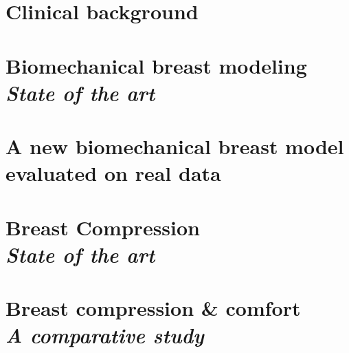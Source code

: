 \documentclass[a4paper,12pt,twoside]{report}
\begin{document}
\clearemptydoublepage

%

\chapter{ Clinical background}\label{chapter:clinicalbachground}


\clearemptydoublepage

\chapter{Biomechanical breast modeling\\ \textit{State of the art}}\label{chapter:bioMecaModelsBackground}


\clearemptydoublepage
\chapter{A new biomechanical breast model evaluated on real data}\label{chapter:myBioMecaModel}




\clearemptydoublepage
\chapter{Breast Compression\\ \textit{State of the art} }\label{chapter:compression:introduction}

\clearemptydoublepage

\chapter{Breast compression \& comfort \\ \textit{A comparative study}}
\label{chapter:compressionfem}

\end{document}
